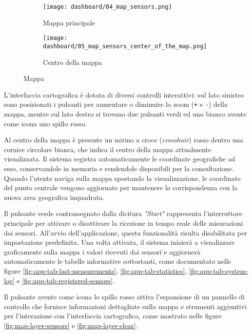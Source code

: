 \begin{figure}
  \centering
  \begin{subfigure}{\textwidth}
    \centering
    \texttt{[image: dashboard/04\_map\_sensors.png]}
    \caption{Mappa principale}
    \label{fig:app-map-sensors}
  \end{subfigure}

  \hfil
  \begin{subfigure}{\textwidth}
    \centering
    \texttt{[image: dashboard/05\_map\_sensors\_center\_of\_the\_map.png]}
    \caption{Centro della mappa}
    \label{fig:app-map-center}
  \end{subfigure}

  \caption{Mappa}
  \label{fig:app-map}
\end{figure}

L'interfaccia cartografica è dotata di diversi controlli interattivi: sul lato sinistro sono posizionati i pulsanti
per aumentare o diminuire lo zoom (\texttt{+} e \texttt{-}) della mappa, mentre sul lato destro si trovano due pulsanti
verdi ed uno bianco avente come icona uno spillo rosso.

Al centro della mappa è presente un mirino a croce (\textit{crosshair}) rosso dentro una cornice circolare bianca,
che indica il centro della mappa attualmente visualizzata. Il sistema registra automaticamente le coordinate geografiche
ad esso, conservandole in memoria e rendendole disponibili per la consultazione. Quando l'utente naviga sulla mappa
spostando la visualizzazione, le coordinate del punto centrale vengono aggiornate per mantenere la corrispondenza
con la nuova area geografica inquadrata.

Il pulsante verde contrassegnato dalla dicitura \textit{"Start"} rappresenta l'interruttore principale
per attivare o disattivare la ricezione in tempo reale delle misurazioni dai sensori.
All'avvio dell'applicazione, questa funzionalità risulta disabilitata per impostazione predefinita.
Una volta attivata, il sistema inizierà a visualizzare graficamente sulla mappa
i valori ricevuti dai sensori e aggiornerà automaticamente le tabelle informative sottostanti,
come documentato nelle figure \ref{fig:app-tab-last-measurements}, \ref{fig:app-tab-statistics},
\ref{fig:app-tab-system-log} e \ref{fig:app-tab-registered-sensors}.

Il pulsante avente come icona lo spillo rosso attiva l'espansione di un pannello di controllo che fornisce informazioni
dettagliate sulla mappa e strumenti aggiuntivi per l'interazione con l'interfaccia cartografica, come mostrato nelle
figure \ref{fig:map-layer-sensors} e \ref{fig:map-layer-clear}.

